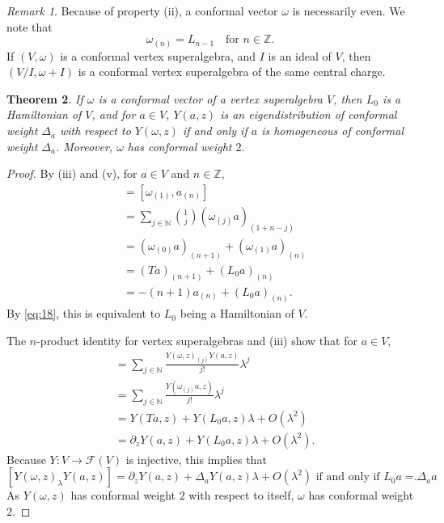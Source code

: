 \documentclass[a4paper, 12pt, reqno]{amsart}
\newtheorem{theorem}{Theorem}[section]
\theoremstyle{remark}
\newtheorem{remark}[theorem]{Remark}
\begin{document}
\begin{remark}
  \label{rmk:18}
  Because of property (ii), a conformal vector $\omega$ is necessarily even.
  We note that
  \begin{equation*}
    \omega_{(n)} = L_{n - 1} \quad \text{for $n \in \mathbb{Z}$}.
  \end{equation*}
  If $(V, \omega)$ is a conformal vertex superalgebra, and $I$ is an ideal of $V$, then $(V/I, \omega + I)$ is a conformal vertex superalgebra of the same central charge.
\end{remark}

\begin{theorem}
  \label{thr:21}
  If $\omega$ is a conformal vector of a vertex superalgebra $V$, then $L_0$ is a Hamiltonian of $V$, and for $a \in V$, $Y(a, z)$ is an eigendistribution of conformal weight $\Delta_a$ with respect to $Y(\omega, z)$ if and only if $a$ is homogeneous of conformal weight $\Delta_a$.
  Moreover, $\omega$ has conformal weight $2$.
\end{theorem}

\begin{proof}
  By (iii) and (v), for $a \in V$ and $n \in \mathbb{Z}$,
  \begin{align*}
    [L_0, a_{(n)}] &= [\omega_{(1)}, a_{(n)}] \\
                   &= \sum_{j \in \mathbb{N}}\binom{1}{j}(\omega_{(j)}a)_{(1 + n - j)} \\
                   &= (\omega_{(0)}a)_{(n + 1)} + (\omega_{(1)}a)_{(n)} \\
                   &= (Ta)_{(n + 1)} + (L_0a)_{(n)} \\
                   &= -(n + 1)a_{(n)} + (L_0a)_{(n)}.
  \end{align*}
  By \eqref{eq:18}, this is equivalent to $L_0$ being a Hamiltonian of $V$.

  The $n$-product identity for vertex superalgebras and (iii) show that for $a \in V$,
  \begin{align*}
    [Y(\omega, z)_{\lambda}Y(a, z)] &= \sum_{j \in \mathbb{N}}\frac{Y(\omega, z)_{(j)}Y(a, z)}{j!}\lambda^j \\
                                    &= \sum_{j \in \mathbb{N}}\frac{Y(\omega_{(j)}a, z)}{j!}\lambda^j \\
                                    &= Y(Ta, z) + Y(L_0a, z)\lambda + O(\lambda^2) \\
                                    &= \partial_zY(a, z) + Y(L_0a, z)\lambda + O(\lambda^2).
  \end{align*}
  Because $Y: V \to \mathcal{F}(V)$ is injective, this implies that
  \begin{equation*}
    \text{$[Y(\omega, z)_{\lambda}Y(a, z)] = \partial_zY(a, z) + \Delta_aY(a, z)\lambda + O(\lambda^2)$ if and only if $L_0a = \Delta_aa$}.
  \end{equation*}
  As $Y(\omega, z)$ has conformal weight $2$ with respect to itself, $\omega$ has conformal weight $2$.
\end{proof}
\end{document}
